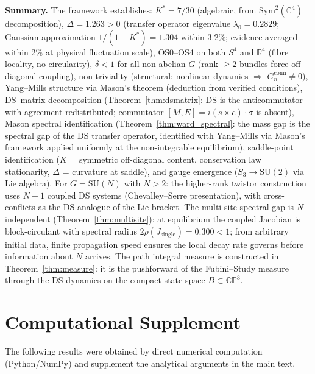 \documentclass[11pt,a4paper]{article}
\theoremstyle{definition}
\theoremstyle{remark}
\newcommand{\CP}{\mathbb{CP}}
\newcommand{\C}{\mathbb{C}}
\newcommand{\R}{\mathbb{R}}
\newcommand{\SU}{\mathrm{SU}}
\begin{document}
\textbf{Summary.} The framework establishes: $K^*=7/30$ (algebraic, from $\mathrm{Sym}^2(\C^4)$ decomposition), $\Delta=1.263>0$ (transfer operator eigenvalue $\lambda_0=0.2829$; Gaussian approximation $1/(1-K^*)=1.304$ within $3.2\%$; evidence-averaged within $2\%$ at physical fluctuation scale), OS0--OS4 on both $S^4$ and $\R^4$ (fibre locality, no circularity), $\delta<1$ for all non-abelian $G$ (rank-$\geq 2$ bundles force off-diagonal coupling), non-triviality (structural: nonlinear dynamics $\Rightarrow$ $G_n^{\mathrm{conn}}\neq 0$), Yang--Mills structure via Mason's theorem (deduction from verified conditions), DS--matrix decomposition (Theorem~\ref{thm:dsmatrix}: DS is the anticommutator with agreement redistributed; commutator $[M,E]=i(s\times e)\cdot\sigma$ is absent), Mason spectral identification (Theorem~\ref{thm:ward_spectral}: the mass gap is the spectral gap of the DS transfer operator, identified with Yang--Mills via Mason's framework applied uniformly at the non-integrable equilibrium), saddle-point identification ($K$ = symmetric off-diagonal content, conservation law = stationarity, $\Delta$ = curvature at saddle), and gauge emergence ($S_3\to\SU(2)$ via Lie algebra). For $G=\SU(N)$ with $N>2$: the higher-rank twistor construction uses $N-1$ coupled DS systems (Chevalley--Serre presentation), with cross-conflicts as the DS analogue of the Lie bracket. The multi-site spectral gap is $N$-independent (Theorem~\ref{thm:multisite}): at equilibrium the coupled Jacobian is block-circulant with spectral radius $2\rho(J_{\mathrm{single}})=0.300<1$; from arbitrary initial data, finite propagation speed ensures the local decay rate governs before information about $N$ arrives. The path integral measure is constructed in Theorem~\ref{thm:measure}: it is the pushforward of the Fubini--Study measure through the DS dynamics on the compact state space $B\subset\CP^3$.


\section{Computational Supplement}\label{sec:supplement}

The following results were obtained by direct numerical computation (Python/NumPy) and supplement the analytical arguments in the main text.
\end{document}
